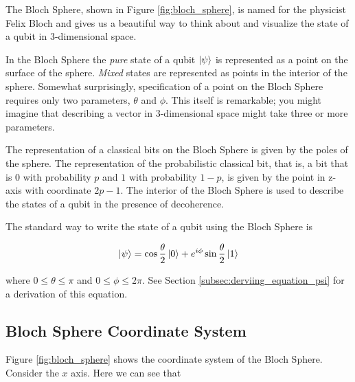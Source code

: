 \documentclass{article}
\theoremstyle{definition}
\begin{document}
\bigskip
\noindent
The Bloch Sphere, shown in Figure \ref{fig:bloch_sphere}, is
named for the physicist Felix Bloch \cite{1946PhRv...70..460B}
and gives us a beautiful way to think about and visualize the
state of a qubit in 3-dimensional space.

\bigskip
\noindent
In the Bloch Sphere the \emph{pure} state of a qubit $\ket{\psi}$
is represented as a point on the surface of the
sphere. \emph{Mixed} states are represented as points in the
interior of the sphere.  Somewhat surprisingly, specification of
a point on the Bloch Sphere requires only two parameters,
$\theta$ and $\phi$. This itself is remarkable; you might imagine
that describing a vector in 3-dimensional space might take three
or more parameters.

\bigskip
\noindent
The representation of a classical bits on the Bloch Sphere is
given by the poles of the sphere.  The representation of the
probabilistic classical bit, that is, a bit that is $0$ with
probability $p$ and $1$ with probability $1 - p$, is given by the
point in z-axis with coordinate $2p - 1$. The interior of the
Bloch Sphere is used to describe the states of a qubit in the
presence of decoherence.

\bigskip
\noindent
The standard way to write the state of a qubit using the Bloch
Sphere is  

\begin{equation}
\ket{\psi}  = \cos \frac{\theta}{2} \ket{0} + e^{i \phi} \sin \frac{\theta}{2} \ket{1}
\label{eqn:standard_psi}
\end{equation}

\bigskip
\noindent
where $0 \leq \theta \leq \pi$ and $0 \leq \phi \leq 2 \pi$. See
Section \ref{subsec:derviing_equation_psi}  for a derivation of
this equation.  

\subsection{Bloch Sphere Coordinate System}
Figure \ref{fig:bloch_sphere} shows the coordinate system of the
Bloch Sphere.  Consider the $x$ axis. Here we can see that 
\end{document}
